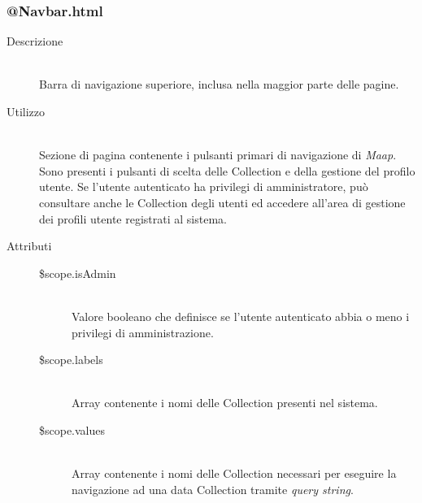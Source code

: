 %	
 	

\subsubsection{@Navbar.html}
\begin{description}
	\item[Descrizione] \hfill \\
	Barra di navigazione superiore, inclusa nella maggior parte delle pagine.
	\item[Utilizzo] \hfill \\
	Sezione di pagina contenente i pulsanti primari di navigazione di \textit{Maap}. Sono presenti i pulsanti di scelta delle Collection e della gestione del profilo utente. Se l'utente autenticato ha privilegi di amministratore, può consultare anche le Collection degli utenti ed accedere all'area di gestione dei profili utente registrati al sistema.
	\item[Attributi] \hfill
 	\begin{description}
 		\item[\$scope.isAdmin] \hfill \\
 		Valore booleano che definisce se l'utente autenticato abbia o meno i privilegi di amministrazione.
 		\item[\$scope.labels] \hfill \\
 		Array contenente i nomi delle Collection presenti nel sistema.
 		\item[\$scope.values] \hfill \\
 		Array contenente i nomi delle Collection necessari per eseguire la navigazione ad una data Collection tramite \textit{query string}.
 	\end{description}
\end{description}

